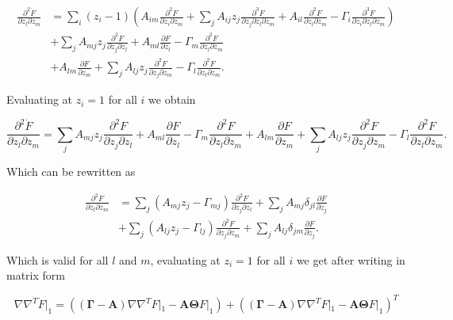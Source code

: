 \begin{equation*}
  \begin{split}
    \frac{\partial^2 \dot{F}}{\partial z_l \partial z_m} &= \sum_i(z_i-1) \left(A_{im}\frac{\partial^2F}{\partial z_i \partial z_m} + \sum_jA_{ij}z_j\frac{\partial^3F}{\partial z_j \partial z_l \partial z_m}+A_{il}\frac{\partial^2F}{\partial z_l\partial z_m} - \Gamma_i\frac{\partial^3F}{\partial z_i \partial z_l \partial z_m}   \right)\\
    &+\sum_jA_{mj}z_j\frac{\partial^2F}{\partial z_j\partial z_l}+A_{ml}\frac{\partial F}{\partial z_l} - \Gamma_m\frac{\partial^2F}{\partial z_l\partial z_m}\\
    &+ A_{lm}\frac{\partial F}{\partial z_m} + \sum_jA_{lj}z_j\frac{\partial^2F}{\partial z_j\partial z_m}-\Gamma_l\frac{\partial^2F}{\partial z_l\partial z_m}.
  \end{split}
\end{equation*}

Evaluating at $z_i=1$ for all $i$ we obtain

\begin{equation*}
  \frac{\partial^2\dot{F}}{\partial z_l \partial z_m} = \sum_jA_{mj}z_j\frac{\partial^2F}{\partial z_j\partial z_l}+A_{ml}\frac{\partial F}{\partial z_l} - \Gamma_m\frac{\partial^2F}{\partial z_l\partial z_m} + A_{lm}\frac{\partial F}{\partial z_m} + \sum_jA_{lj}z_j\frac{\partial^2F}{\partial z_j\partial z_m}-\Gamma_l\frac{\partial^2F}{\partial z_l\partial z_m}.
\end{equation*}

Which can be rewritten as

\begin{equation*}
  \begin{split}
    \frac{\partial^2\dot{F}}{\partial z_l \partial z_m} &= \sum_j\left(A_{mj}z_j-\Gamma_{mj}\right)\frac{\partial^2F}{\partial z_j\partial z_l} + \sum_jA_{mj}\delta_{jl}\frac{\partial F}{\partial z_j}\\
    &+\sum_j\left(A_{lj}z_j-\Gamma_{lj}\right)\frac{\partial^2F}{\partial z_j\partial z_m} + \sum_jA_{lj}\delta_{jm}\frac{\partial F}{\partial z_j}.
  \end{split}
\end{equation*}

Which is valid for all $l$ and $m$, evaluating at $z_i=1$ for all $i$ we get after writing in matrix form

\begin{equation}
  \label{eq:mas-general}
  \boxed{\nabla\nabla^T\dot{F}|_1 = \left(\left(\mathbf{\Gamma} - \mathbf{A}\right)\nabla\nabla^TF|_1 - \mathbf{A}\mathbf{\Theta} F|_1\right)+\left(\left(\mathbf{\Gamma} - \mathbf{A}\right)\nabla\nabla^TF|_1 - \mathbf{A}\mathbf{\Theta} F|_1\right)^T}
\end{equation}

